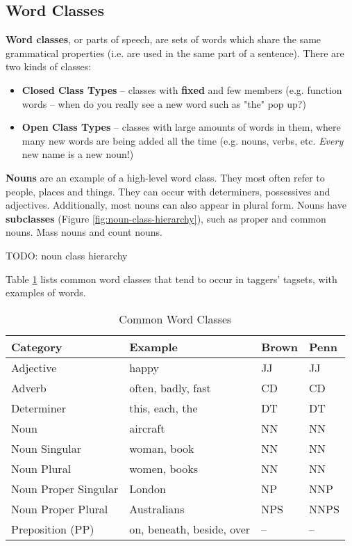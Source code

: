 \documentclass{article}
\begin{document}
\subsection{Word Classes}

\textbf{Word classes}, or parts of speech, are sets of words which share the same grammatical properties (i.e. are used in the same part of a sentence). There are two kinds of classes:
\begin{itemize}
	\item \textbf{Closed Class Types} -- classes with \textbf{fixed} and few members (e.g. function words -- when do you really see a new word such as "the" pop up?)
	\item \textbf{Open Class Types} -- classes with large amounts of words in them, where many new words are being added all the time (e.g. nouns, verbs, etc. \textit{Every} new name is a new noun!)
\end{itemize}

\textbf{Nouns} are an example of a high-level word class. They most often refer to people, places and things. They can occur with determiners, possessives and adjectives. Additionally, most nouns can also appear in plural form. Nouns have \textbf{subclasses} (Figure \ref{fig:noun-class-hierarchy}), such as proper and common nouns. Mass nouns and count nouns.

TODO: noun class hierarchy

Table \ref{tab:common-word-classes} lists common word classes that tend to occur in taggers' tagsets, with examples of words.

\begin{table}
	\centering
	\begin{tabular}{|l|l|l|l|}
		\hline
		\textbf{Category} & \textbf{Example} & \textbf{Brown} & \textbf{Penn} \\
		\hline
		Adjective & happy & JJ & JJ \\
		Adverb & often, badly, fast & CD & CD \\
		Determiner & this, each, the & DT & DT \\
		Noun & aircraft & NN & NN \\
		Noun Singular & woman, book & NN & NN \\
		Noun Plural & women, books & NN & NN \\
		Noun Proper Singular & London & NP & NNP \\
		Noun Proper Plural & Australians & NPS & NNPS \\
		Preposition (PP) & on, beneath, beside, over & -- & -- \\
		\hline 
	\end{tabular}
	\caption{Common Word Classes}
	\label{tab:common-word-classes} 
\end{table}
\end{document}
